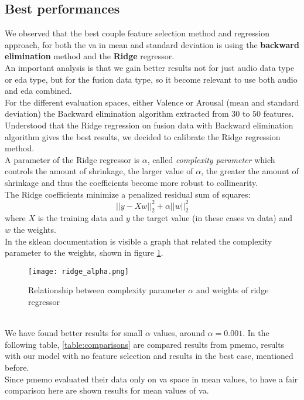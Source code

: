 \subsection{Best performances}
We observed that the best couple feature selection method and regression approach, for both the \gls{va} in mean and standard deviation is using the \textbf{backward elimination} method and the \textbf{Ridge} regressor.
\\ \indent
An important analysis is that we gain better results not for just audio data type or \gls{eda} type, but for the fusion data type, so it become relevant to use both audio and \gls{eda} combined.
\\ \indent
For the different evaluation spaces, either Valence or Arousal (mean and standard deviation) the Backward elimination algorithm extracted from $30$ to $50$ features.
\\
Understood that the Ridge regression on fusion data with Backward elimination algorithm gives the best results, we decided to calibrate the Ridge regression method.
\\
A parameter of the Ridge regressor is $\alpha$, called \textit{complexity parameter} which controls the amount of shrinkage, the larger value of $\alpha$, the greater the amount of shrinkage and thus the coefficients become more robust to collinearity.
\\
The Ridge coefficients minimize a penalized residual sum of squares:
\begin{equation}
	||y-Xw||^2_2+\alpha ||w||^2_2
\end{equation}
where $X$ is the training data and $y$ the target value (in these cases \gls{va} data) and $w$ the weights.
\\
In the sklean documentation is visible a graph that related the complexity parameter to the weights, shown in figure \ref{fig:ridge_alpha}.
\begin{figure}[h]
    \centering
    \texttt{[image: ridge\_alpha.png]} 
	\caption{Relationship between complexity parameter $\alpha$ and weights of ridge regressor}
    \label{fig:ridge_alpha}
\end{figure}
\\
We have found better results for small $\alpha$ values, around $\alpha=0.001$.
In the following table, \ref{table:comparisons} are compared results from \gls{pmemo}, results with our model with no feature selection and results in the best case, mentioned before.
\\
Since \gls{pmemo} evaluated their data only on \gls{va} space in mean values, to have a fair comparison here are shown results for mean values of \gls{va}.
